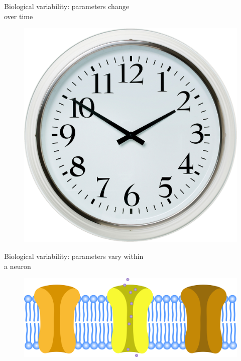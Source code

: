 \documentclass[presentation]{beamer}
\begin{document}

\begin{frame}{Biological variability: parameters change \\ over time }
  \begin{figure}
    \includegraphics[height=0.7\textheight]{time.png}

  \end{figure}

\end{frame}



\begin{frame}{Biological variability: parameters vary within \\ a neuron}
  \begin{figure}
    \includegraphics[width=1\textwidth]{channels_diverse.png}

  \end{figure}

\end{frame}
\end{document}
